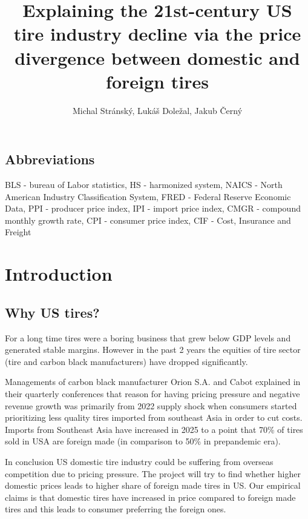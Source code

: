 \documentclass{article}
\title{Explaining the 21st-century US tire industry decline via the price divergence between domestic and foreign tires}
\author{Michal Stránský, Lukáš Doležal, Jakub Černý}
\begin{document}
\maketitle
        
\subsection*{Abbreviations}
BLS - bureau of Labor statistics, HS - harmonized system, NAICS - North American Industry Classification System, FRED - Federal Reserve Economic Data, PPI - producer price index, IPI - import price index, CMGR - compound monthly growth rate,  CPI - consumer price index, CIF - Cost, Insurance and Freight 
\section{Introduction}
\subsection*{Why US tires?}

For a long time tires were a boring business that grew below GDP levels and generated stable margins. However in the past 2 years the equities of tire sector (tire and carbon black manufacturers) have dropped significantly.

Managements of carbon black manufacturer Orion S.A. and Cabot explained in their quarterly conferences that reason for having pricing pressure and negative revenue growth was primarily from 2022 supply shock when consumers started prioritizing less quality tires imported from southeast Asia in order to cut costs. Imports from Southeast Asia have  increased in 2025 to a point that 70\% of tires sold in USA are foreign made (in comparison to 50\% in prepandemic era).

In conclusion US domestic tire industry could be suffering from overseas competition due to pricing pressure. The project will try to find whether higher domestic prices leads to higher share of foreign made tires in US. 
Our empirical claims is that domestic tires have increased in price compared to foreign made tires and this leads to consumer preferring the foreign ones.
\end{document}
